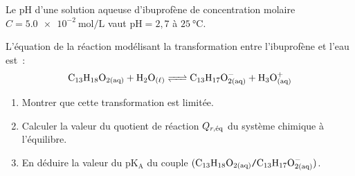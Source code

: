 Le $\mathrm{pH}$ d'une solution aqueuse d'ibuprofène de concentration molaire
$C=\qty{5.0e-2}{\mol\per\L}$ vaut $\mathrm{pH}=2,7$ à
$\qty{25}{\degreeCelsius}$.

L'équation de la réaction modélisant la transformation entre l'ibuprofène et
l'eau est~:
\[
    \ce{C13H18O_{2(aq)} + H2O_{(\ell)} <=> C13H17O^-_{2(aq)} + H3O^+_{(aq)}}
\]

\begin{enumerate}
    \item Montrer que cette transformation est limitée.
    \item Calculer la valeur du quotient de réaction $Q_{r,\eq}$ du système
          chimique à l'équilibre.
    \item En déduire la valeur du $\mathrm{pK_{A}}$ du couple
          $(\ce{C13H18O_{2(aq)}}\ttslash{}\ce{C13H17O^-_{2(aq)}})$.
\end{enumerate}


